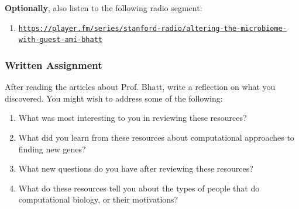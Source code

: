\documentclass{article}
\begin{document}
\textbf{Optionally}, also listen to the following radio segment:
\begin{enumerate}
\item \texttt{\href{https://player.fm/series/stanford-radio/altering-the-microbiome-with-guest-ami-bhatt}{https://player.fm/series/stanford-radio/altering-the-microbiome-with-guest-ami-bhatt}}
\end{enumerate}

\subsubsection*{Written Assignment} 
After reading the articles about Prof. Bhatt, write a reflection on what you discovered. You might wish to address some of the following: 

\begin{enumerate}
\item What was most interesting to you in reviewing these resources?
\item What did you learn from these resources about computational approaches to finding new genes?
\item What new questions do you have after reviewing these resources?
\item What do these resources tell you about the types of people that do computational biology, or their motivations?
\end{enumerate}

\EndAccSupp{}
\end{document}
